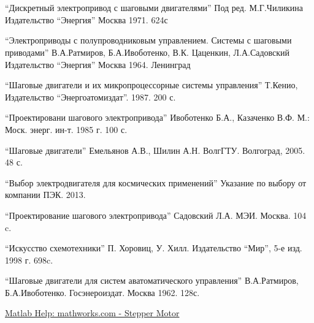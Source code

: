 \newpage
\section[Список использованной литературы]{}
\begin{thebibliography}{30}

     ``Дискретный электропривод с шаговыми двигателями'' Под ред. М.Г.Чиликина
                        Издательство ``Энергия'' Москва 1971. 624с

     ``Электроприводы с полупроводниковым управлением. Системы с шаговыми приводами''
                                    В.А.Ратмиров, Б.А.Ивоботенко, В.К. Цаценкин, Л.А.Садовский
                                    Издательство ``Энергия'' Москва 1964. Ленинград

     ``Шаговые двигатели и их микропроцессорные системы управления'' Т.Кенио,
                    Издательство ``Энергоатомиздат''. 1987. 200 с.

     ``Проектировани шагового электропривода''
                                    Ивоботенко Б.А., Казаченко В.Ф. М.:
                                    Моск. энерг. ин-т. 1985 г. 100 с.

     ``Шаговые двигатели''
                                Емельянов А.В., Шилин А.Н.
                                ВолгГТУ. Волгоград, 2005. 48 с.

     ``Выбор электродвигателя для космических применений''
                                        Указание по выбору от компании ПЭК. 2013.

     ``Проектирование шагового электропривода''
                        Садовский Л.А. МЭИ. Москва. 104 c.

     ``Искусство схемотехники''
                            П. Хоровиц, У. Хилл.
                            Издательство ``Мир'', 5-е изд. 1998 г. 698c.

     ``Шаговые двигатели для систем аватоматического управления''
                                                В.А.Ратмиров, Б.А.Ивоботенко.
                                                Госэнероиздат. Москва 1962. 128с.

     \href{http://www.mathworks.com/help/physmod/sps/powersys/ref/steppermotor.html}
                                            {Matlab Help: mathworks.com - Stepper Motor}


\end{thebibliography}

